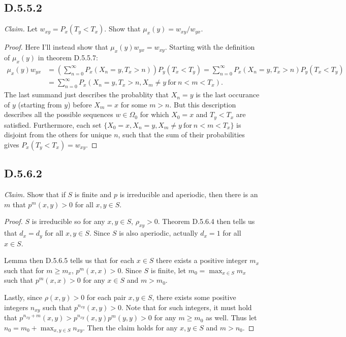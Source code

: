 \documentclass[10pt]{article}
\begin{document}
\subsection*{D.5.5.2}
\textit{Claim.} Let $w_{xy} = P_x(T_y < T_x)$.
Show that $\mu_x(y) = w_{xy}/w_{yx}$.

\begin{proof}
  Here I'll instead show that $\mu_x(y) w_{yx} = w_{xy}$.
  Starting with the definition of $\mu_x(y)$ in
  theorem D.5.5.7:
  \begin{equation*}
  \begin{aligned}
    \mu_x(y) w_{yx} 
    & = \left( \sum_{n=0}^\infty P_x(X_n = y, T_x > n) \right) P_y(T_x < T_y)
    = \sum_{n=0}^\infty P_x(X_n = y, T_x > n) P_y(T_x < T_y) \\
    & = \sum_{n=0}^\infty P_x(X_n = y, T_x > n, X_m \ne y 
    \ \text{for} \ n < m < T_x).
  \end{aligned}
  \end{equation*}
  The last summand just describes the probablity that
  $X_n = y$ is the last occurance of $y$ (starting from $y$)
  before $X_m = x$ for some $m > n$. But this description 
  describes all the possible sequences $w \in \Omega_0$ for which
  $X_0 = x$ and $T_y < T_x$ are satisfied.
  Furthermore, each set $\{X_0 = x, X_n=y, X_m \ne y \ \text{for} \
  n < m < T_x \}$ is disjoint from the others for unique $n$,
  such that the sum of their probabilities gives 
  $P_x(T_y<T_x) = w_{xy}$.
\end{proof}

\subsection*{D.5.6.2}
\textit{Claim.} Show that if $S$ is finite and $p$ is irreducible
and aperiodic, then there is an $m$ that $p^m(x,y) > 0$ for all 
$x,y \in S$.

\begin{proof}
  $S$ is irreducible so for any $x,y \in S$, $\rho_{xy} > 0$.
  Theorem D.5.6.4 then tells us that $d_x = d_y$ for all
  $x,y \in S$. Since $S$ is also aperiodic, actually $d_x = 1$
  for all $x \in S$.
  
  Lemma then D.5.6.5 tells us that for each $x \in S$ there exists
  a positive integer $m_x$ such that for $m \ge m_x$, $p^m(x,x) > 0$.
  Since $S$ is finite, let $m_0 = \max_{x \in S} m_x$ such that
  $p^m(x,x) > 0$ for any $x \in S$ and $m > m_0$.

  Lastly, since $\rho(x,y)>0$ for each pair $x,y \in S$, 
  there exists some positive integers $n_{xy}$ such that 
  $p^{n_{xy}}(x,y) > 0$. Note that for such integers, 
  it must hold that $p^{n_{xy}+m}(x,y) 
  > p^{n_{xy}}(x,y)p^{m}(y,y) > 0$ for any $m \ge m_0$ as well. 
  Thus let $n_0 = m_0 + \max_{x,y \in S} n_{xy}$.
  Then the claim holds for any $x,y \in S$ and $m > n_0$.
\end{proof}
\end{document}
